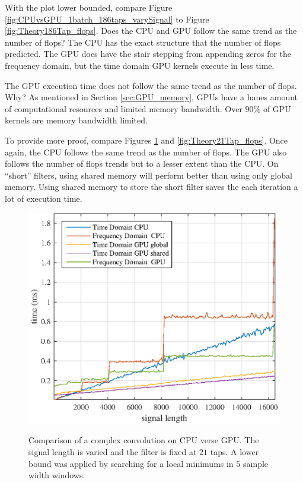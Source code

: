With the plot lower bounded, compare Figure \ref{fig:CPUvsGPU_1batch_186taps_varySignal} to Figure \ref{fig:Theory186Tap_flops}.
Does the CPU and GPU follow the same trend as the number of flops?
The CPU has the exact structure that the number of flops predicted.
The GPU does have the stair stepping from appending zeros for the frequency domain, but the time domain GPU kernels execute in less time.

The GPU execution time does not follow the same trend as the number of flops.
Why? As mentioned in Section \ref{sec:GPU_memory}, GPUs have a hanes amount of computational resources and limited memory bandwidth.
Over $90\%$ of GPU kernels are memory bandwidth limited.

To provide more proof, compare Figures \ref{fig:CPUvsGPU_1batch_21taps_varySignal} and \ref{fig:Theory21Tap_flops}.
Once again, the CPU follows the same trend as the number of flops.
The GPU also follows the number of flops trends but to a lesser extent than the CPU.
On ``short'' filters, using shared memory will perform better than using only global memory.
Using shared memory to store the short filter saves the each iteration a lot of execution time.
\begin{figure}
	\caption{Comparison of a complex convolution on CPU verse GPU. The signal length is varied and the filter is fixed at $21$ taps. A lower bound was applied by searching for a local minimums in $5$ sample width windows.}
	\centering\includegraphics[width=5in]{figures/gpu_intro/CPUvsGPU_1batch_21taps_varySignal.eps}
	\label{fig:CPUvsGPU_1batch_21taps_varySignal}
\end{figure}


